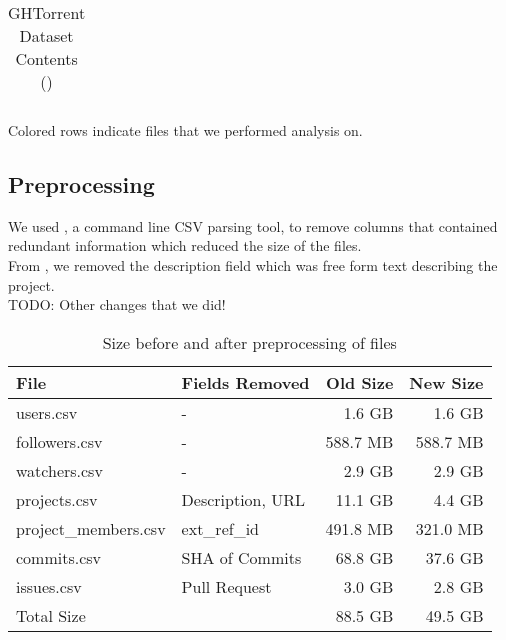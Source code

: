 \begin{table}[htb]
\begin{tabular}{@{}llrl@{}}
        \bottomrule
    \end{tabular}

    \caption{GHTorrent Dataset Contents ()}
    \small{Colored rows indicate files that we performed analysis on.}
\end{table}

\newpage
\subsection{Preprocessing}

We used , a command line CSV parsing tool, to remove columns that contained redundant information which reduced the size of the files. \\

From , we removed the description field which was free form text describing the project. \\

\large{ TODO: Other changes that we did! }

\vspace{25px}
\begin{table}[htb]
    \centering

    \begin{tabular}{@{}llrr@{}}
    \toprule
        File & Fields Removed & Old Size & New Size \\
    \midrule
        users.csv            & -                &   1.6 GB &    1.6 GB \\
        followers.csv        & -                & 588.7 MB &  588.7 MB \\
        watchers.csv         & -                &   2.9 GB &    2.9 GB \\
        projects.csv         & Description, URL &  11.1 GB &    4.4 GB \\
        project\_members.csv & ext\_ref\_id     & 491.8 MB &  321.0 MB \\
        commits.csv          & SHA of Commits   &  68.8 GB &   37.6 GB \\
        issues.csv           & Pull Request     &   3.0 GB &    2.8 GB \\
    \midrule
        Total Size           &                  &  88.5 GB &   49.5 GB \\
    \bottomrule
    \end{tabular}

    \caption{Size before and after preprocessing of files}
\end{table}
